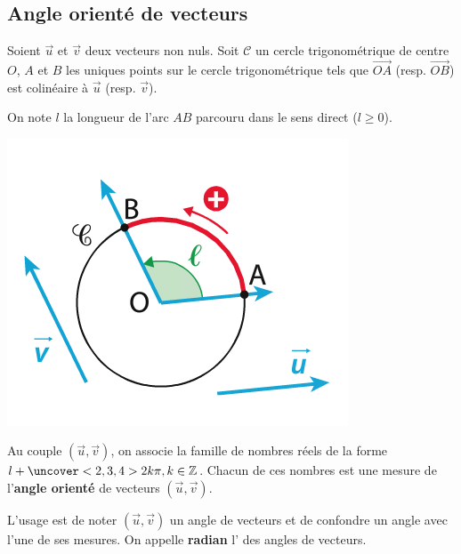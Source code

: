 \documentclass{beamer}
\theoremstyle{plain}
\begin{document}
   \subsection{Angle orienté de vecteurs}

  \begin{frame}
  
  Soient $\vec{u}$ et $\vec{v}$ deux vecteurs non nuls. Soit $\mathcal{C}$ un cercle trigonométrique de 
  centre $O$, $A$ et $B$ les uniques points sur le cercle trigonométrique tels que $\vec{OA}$ 
  (resp. $\vec{OB}$) est colinéaire à $\vec{u}$ (resp. $\vec{v}$).
 
 
  On note $l$ la longueur de l'arc $AB$ parcouru dans le sens direct ($l \geq 0$).

  \begin{center}
    \includegraphics[scale=0.5]{../Images/angleOriente.png}
  \end{center}
  
\end{frame}

\begin{frame}
  \begin{definition}
  Au couple $(\vec{u},\vec{v})$, on associe la famille de nombres réels de la forme 
  $l+\uncover<2,3,4>{2k\pi}, k \in \mathbb{Z}$. Chacun de ces nombres est une mesure de l'\textbf{angle orienté}
   de vecteurs $(\vec{u},\vec{v})$.
   
   L'usage est de noter $(\vec{u},\vec{v})$ un angle de vecteurs et de confondre un angle avec l'une
   de ses mesures. On appelle \textbf{radian} l' des angles 
    de vecteurs.

  
  \end{definition}
       \end{frame}
       
\end{document}
